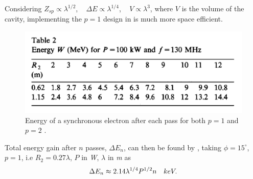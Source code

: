 \documentclass{article}
\begin{document}
Considering $Z_{sp} \propto \lambda^{1/2}$, \,\,\, $\Delta E \propto \lambda^{1/4}$, \,\,\,   $V \propto \lambda^3$, where $V$ is the volume of the cavity, implementing the $p=1$ design in  is much more space efficient.
\begin{figure}[H]
    \centering
    \includegraphics[width=.9\textwidth]{../../../figures/pottier_table2.png}
    \caption{Energy of a synchronous electron after each pass for both $p=1$ and $p=2$ \cite{rhodo_pottier}.}
    \label{fig:pottier_table2}
\end{figure}
Total energy gain after $n$ passes, $\Delta E_n$, can then be found by , taking $\phi = 15^\circ$, $p=1$, i.e $R_2 = 0.27 \lambda$, $P$ in \textit{W}, $\lambda$ in \textit{m} as
\vspace{-10pt}\begin{equation}
    \label{eq:W_total_gain_pottier}
    \Delta E_n \approx 2.14 \lambda^{1/4} P^{1/2} n \quad keV .
\vspace{-10pt}\end{equation}
\end{document}
